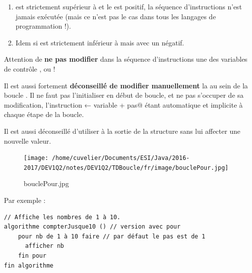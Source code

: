 \documentclass[11pt,a4paper]{article}
\begin{document}
					\begin{enumerate}
				
			\item {} est strictement sup\'erieur \`a \verb@fin@ 
            et le \verb@pas@ est positif, la s\'equence d'instructions n'est
            jamais ex\'ecut\'ee (mais ce n'est pas le cas dans tous les langages de programmation !). 
          
			\item 
            Idem si  est strictement inf\'erieur \`a \verb@fin@ 
            mais avec un \verb@pas@ n\'egatif.
          
					\end{enumerate}
				
            \par
        
        Attention de \textbf{ne pas modifier} dans la s\'equence d'instructions une des variables de contr\^ole
        , \verb@fin@ ou \verb@pas@ ! 
      
            \par
        
        Il est aussi fortement \textbf{d\'econseill\'e de modifier \guillemotleft  manuellement }\guillemotright  
        la \verb@variable@ 
        au sein de la boucle \verb@pour@. 
        Il ne faut pas l'initialiser en d\'ebut de boucle, et ne pas s'occuper de sa modification,
         l'instruction \verb@variable ← variable + pas@ \'etant automatique
        et implicite \`a chaque \'etape de la boucle. 
      
            \par
        
        Il est aussi d\'econseill\'e d'utiliser \verb@variable@ \`a la sortie
        de la structure \verb@pour@ sans lui affecter une nouvelle valeur.
      
            \par
        \begin{figure}[hbt]
				    \begin{center}
					\texttt{[image: /home/cuvelier/Documents/ESI/Java/2016-2017/DEV1Q2/notes/DEV1Q2/TDBoucle/fr/image/bouclePour.jpg]}
						\end{center}
                
                    \caption[bouclePour.jpg]{bouclePour.jpg}
                \end{figure}
                    
            \par
        Par exemple : 
            \par
        \begin{verbatim}
// Affiche les nombres de 1 à 10.
algorithme compterJusque10 () // version avec pour
    pour nb de 1 à 10 faire // par défaut le pas est de 1
      afficher nb
    fin pour
fin algorithme
    \end{verbatim}
			
\end{document}
